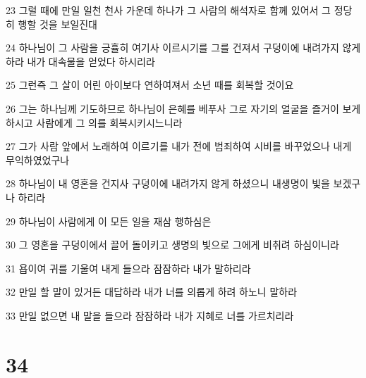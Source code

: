 \par 23 그럴 때에 만일 일천 천사 가운데 하나가 그 사람의 해석자로 함께 있어서 그 정당히 행할 것을 보일진대
\par 24 하나님이 그 사람을 긍휼히 여기사 이르시기를 그를 건져서 구덩이에 내려가지 않게 하라 내가 대속물을 얻었다 하시리라
\par 25 그런즉 그 살이 어린 아이보다 연하여져서 소년 때를 회복할 것이요
\par 26 그는 하나님께 기도하므로 하나님이 은혜를 베푸사 그로 자기의 얼굴을 즐거이 보게 하시고 사람에게 그 의를 회복시키시느니라
\par 27 그가 사람 앞에서 노래하여 이르기를 내가 전에 범죄하여 시비를 바꾸었으나 내게 무익하였었구나
\par 28 하나님이 내 영혼을 건지사 구덩이에 내려가지 않게 하셨으니 내생명이 빛을 보겠구나 하리라
\par 29 하나님이 사람에게 이 모든 일을 재삼 행하심은
\par 30 그 영혼을 구덩이에서 끌어 돌이키고 생명의 빛으로 그에게 비취려 하심이니라
\par 31 욥이여 귀를 기울여 내게 들으라 잠잠하라 내가 말하리라
\par 32 만일 할 말이 있거든 대답하라 내가 너를 의롭게 하려 하노니 말하라
\par 33 만일 없으면 내 말을 들으라 잠잠하라 내가 지혜로 너를 가르치리라

\chapter{34}

